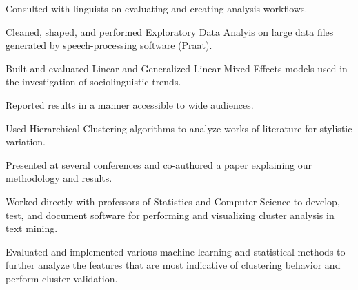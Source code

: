 \documentclass[letterpaper]{deedy-resume} %
\begin{document}
\begin{minipage}[t]{0.63\textwidth}
\sectionspace %


\begin{tightitemize}
\item Consulted with linguists on evaluating and creating analysis workflows.
\item Cleaned, shaped, and performed Exploratory Data Analyis on
  large data files generated by speech-processing software (Praat).
\item Built and evaluated Linear and Generalized Linear Mixed Effects
  models used in the
  investigation of sociolinguistic trends.
\item Reported results in a manner accessible to wide audiences.
\end{tightitemize}

\sectionspace %


\begin{tightitemize}
\item Used Hierarchical Clustering algorithms to analyze
  works of literature  for stylistic variation.
\item Presented at several conferences and co-authored a paper
  explaining our methodology and results.
\end{tightitemize}

\sectionspace %


\begin{tightitemize}
\item Worked directly with professors of Statistics and Computer Science to
  develop, test, and document software for performing and visualizing
  cluster analysis in text mining.
\item Evaluated and implemented various machine learning and statistical
  methods to further analyze the features that are most indicative of
  clustering behavior and perform cluster validation.
\end{tightitemize}


\end{minipage}
\end{document}

